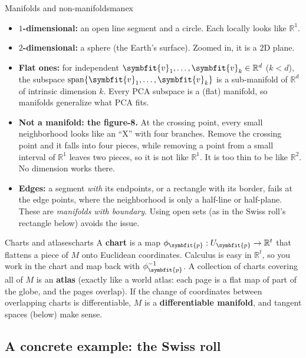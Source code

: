 \documentclass[11pt]{article}
\newcommand{\bm}[1]{\symbfit{#1}}
\newcommand{\R}{\mathbb{R}}
\newcommand{\spn}{\operatorname{span}}
\begin{document}
\begin{example}{Manifolds and non-manifolds}{manex}
\begin{itemize}[nosep]
\item \textbf{$1$-dimensional:} an open line segment and a circle. Each locally looks like $\R^1$.
\item \textbf{$2$-dimensional:} a sphere (the Earth's surface). Zoomed in, it is a $2$D plane.
\item \textbf{Flat ones:} for independent $\bm v_1,\dots,\bm v_k\in\R^d$ ($k<d$), the subspace $\spn\{\bm v_1,\dots,\bm v_k\}$ is a sub-manifold of
$\R^d$ of intrinsic dimension $k$. Every PCA subspace is a (flat) manifold, so manifolds generalize what PCA fits.
\item \textbf{Not a manifold: the figure-8.} At the crossing point, every small neighborhood looks like an ``X'' with four
branches. Remove the crossing point and it falls into four pieces, while removing a point from a small interval of $\R^1$
leaves two pieces, so it is not like $\R^1$. It is too thin to be like $\R^2$. No dimension works there.
\item \textbf{Edges:} a segment \emph{with} its endpoints, or a rectangle with its border, fails at the edge points, where
the neighborhood is only a half-line or half-plane. These are \emph{manifolds with boundary}. Using open sets (as in
the Swiss roll's rectangle below) avoids the issue.
\end{itemize}
\end{example}

\begin{definition}{Charts and atlases}{charts}
A \textbf{chart} is a map $\phi_{\bm p}:U_{\bm p}\to\R^t$ that flattens a piece of $M$ onto Euclidean coordinates. Calculus is easy in
$\R^t$, so you work in the chart and map back with $\phi_{\bm p}^{-1}$. A collection of charts covering all of $M$ is an
\textbf{atlas} (exactly like a world atlas: each page is a flat map of part of the globe, and the pages overlap). If the
change of coordinates between overlapping charts is differentiable, $M$ is a \textbf{differentiable manifold}, and tangent
spaces (below) make sense.
\end{definition}

\subsection{A concrete example: the Swiss roll}
\end{document}
